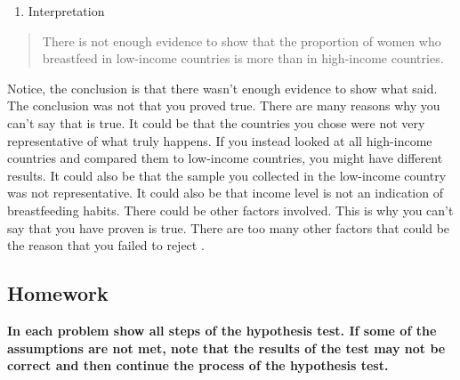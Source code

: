 \documentclass[]{book}
\providecommand{\tightlist}{%
  \setlength{\itemsep}{0pt}\setlength{\parskip}{0pt}}
\begin{document}
\begin{enumerate}
\def\labelenumi{\arabic{enumi}.}
\setcounter{enumi}{5}
\tightlist
\item
  Interpretation
\end{enumerate}

\begin{quote}
There is not enough evidence to show that the proportion of women who
breastfeed in low-income countries is more than in high-income
countries.
\end{quote}

Notice, the conclusion is that there wasn't enough evidence to show
what said. The conclusion was not that you proved true. There are many
reasons why you can't say that is true. It could be that the countries
you chose were not very representative of what truly happens. If you
instead looked at all high-income countries and compared them to
low-income countries, you might have different results. It could also be
that the sample you collected in the low-income country was not
representative. It could also be that income level is not an indication
of breastfeeding habits. There could be other factors involved. This is
why you can't say that you have proven is true. There are too many other
factors that could be the reason that you failed to reject .

\hypertarget{homework-21}{%
\subsection{Homework}\label{homework-21}}

\textbf{In each problem show all steps of the hypothesis test. If some of the
assumptions are not met, note that the results of the test may not be
correct and then continue the process of the hypothesis test.}
\end{document}
